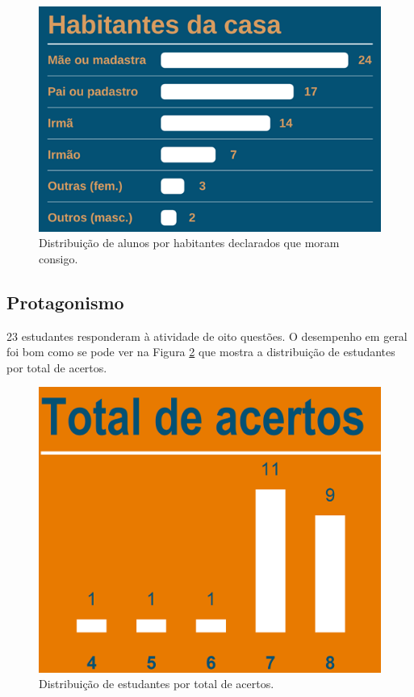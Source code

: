 \documentclass[
]{book}
\begin{document}
\begin{figure}

{\centering \includegraphics[width=0.75\linewidth,height=0.75\textheight]{images/Impactos/10} 

}

\caption{Distribuição de alunos por habitantes declarados que moram consigo.}\label{fig:impacto10}
\end{figure}

\hypertarget{protagonismo}{%
\subsection{Protagonismo}\label{protagonismo}}

23 estudantes responderam à atividade de oito questões. O desempenho em geral foi bom como se pode ver na Figura \ref{fig:impacto11} que mostra a distribuição de estudantes por total de acertos.

\begin{figure}

{\centering \includegraphics[width=0.75\linewidth,height=0.75\textheight]{images/Impactos/11} 

}

\caption{Distribuição de estudantes por total de acertos.}\label{fig:impacto11}
\end{figure}
\end{document}
